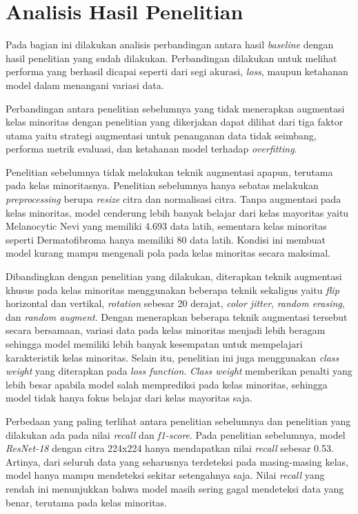 \section{Analisis Hasil Penelitian} \label{IV.Analisis}
Pada bagian ini dilakukan analisis perbandingan antara hasil \textit{baseline} 
dengan hasil penelitian yang sudah dilakukan. Perbandingan dilakukan 
untuk melihat performa yang berhasil dicapai seperti dari segi akurasi, 
\textit{loss}, maupun ketahanan model dalam menangani variasi 
data. \par

Perbandingan antara penelitian sebelumnya yang tidak menerapkan augmentasi 
kelas minoritas dengan penelitian yang dikerjakan dapat dilihat dari tiga 
faktor utama yaitu strategi augmentasi untuk penanganan data tidak 
seimbang, performa metrik evaluasi, dan ketahanan model terhadap 
\textit{overfitting}. \par

Penelitian sebelumnya tidak melakukan teknik augmentasi apapun, terutama 
pada kelas minoritasnya. Penelitian sebelumnya hanya sebatas melakukan 
\textit{preprocessing} berupa \textit{resize} citra dan normalisasi citra. 
Tanpa augmentasi pada kelas minoritas, model cenderung lebih banyak 
belajar dari kelas mayoritas yaitu Melanocytic Nevi yang memiliki 4.693 
data latih, sementara kelas minoritas seperti Dermatofibroma hanya 
memiliki 80 data latih. Kondisi ini membuat model kurang mampu mengenali 
pola pada kelas minoritas secara maksimal. \par

Dibandingkan dengan penelitian yang dilakukan, diterapkan teknik augmentasi 
khusus pada kelas minoritas menggunakan beberapa teknik sekaligus yaitu 
\textit{flip} horizontal dan vertikal, \textit{rotation} sebesar 20 derajat, 
\textit{color jitter}, \textit{random erasing}, dan \textit{random augment}. 
Dengan menerapkan beberapa teknik augmentasi tersebut secara bersamaan, 
variasi data pada kelas minoritas menjadi lebih beragam sehingga model 
memiliki lebih banyak kesempatan untuk mempelajari karakteristik kelas 
minoritas. Selain itu, penelitian ini juga menggunakan \textit{class weight} 
yang diterapkan pada \textit{loss function}. \textit{Class weight} memberikan 
penalti yang lebih besar apabila model salah memprediksi pada kelas 
minoritas, sehingga model tidak hanya fokus belajar dari kelas mayoritas 
saja. \par

Perbedaan yang paling terlihat antara penelitian sebelumnya dan penelitian 
yang dilakukan ada pada nilai \textit{recall} dan \textit{f1-score}. Pada penelitian 
sebelumnya, model \textit{ResNet-18} dengan citra 224x224 hanya 
mendapatkan nilai \textit{recall} sebesar 0.53. Artinya, dari seluruh 
data yang seharusnya terdeteksi pada masing-masing kelas, model hanya 
mampu mendeteksi sekitar setengahnya saja. Nilai \textit{recall} yang 
rendah ini menunjukkan bahwa model masih sering gagal mendeteksi data 
yang benar, terutama pada kelas minoritas. \par

